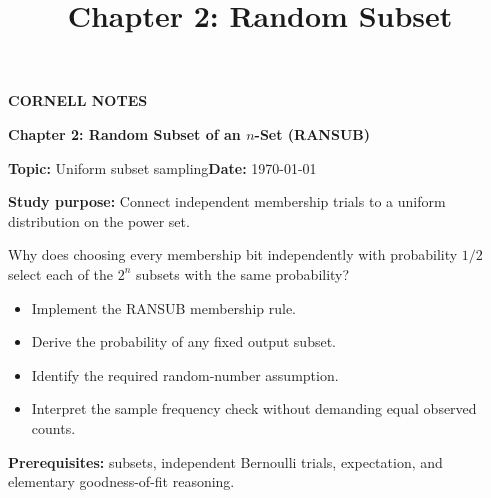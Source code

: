 \documentclass[10pt,letterpaper]{article}
\title{Chapter 2: Random Subset}
\author{}
\date{}
\begin{document}
\maketitle
\begin{tcolorbox}[colback=Paper,colframe=Ink,boxrule=1pt,arc=2mm]
{\small\bfseries\color{Teal}CORNELL NOTES}\par{\LARGE\bfseries Chapter 2: Random Subset of an $n$-Set (RANSUB)}\par\medskip
\textbf{Topic:} Uniform subset sampling\hfill\textbf{Date:} \today\par
\textbf{Study purpose:} Connect independent membership trials to a uniform distribution on the power set.
\end{tcolorbox}
\begin{tcolorbox}[colback=Teal!5,colframe=Teal,title=Essential question]
Why does choosing every membership bit independently with probability $1/2$ select each of the $2^n$ subsets with the same probability?
\end{tcolorbox}
\begin{tcolorbox}[colback=white,colframe=Mist,title=Learning objectives]
\begin{itemize}\item Implement the RANSUB membership rule.\item Derive the probability of any fixed output subset.\item Identify the required random-number assumption.\item Interpret the sample frequency check without demanding equal observed counts.\end{itemize}
\textbf{Prerequisites:} subsets, independent Bernoulli trials, expectation, and elementary goodness-of-fit reasoning.
\end{tcolorbox}
\end{document}
